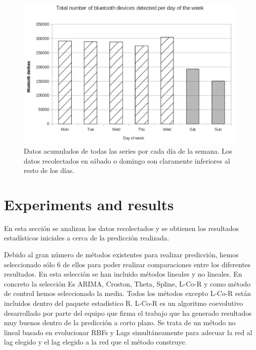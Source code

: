 \documentclass[runningheads]{llncs}
\begin{document}
\begin{figure}[htb]
 \begin{center}
\includegraphics[scale=0.6]{weekly.eps} 
 \caption{Datos acumulados de todas las series por cada día de la semana. Los datos recolectados
en sábado o domingo son claramente inferiores al resto de los días. 
 \label{fig:weekly}}
 \end{center}
 \end{figure}

\section{Experiments and results}
\label{sec:experiments}

En esta sección se analizan los datos recolectados y se obtienen los resultados estadísticos
iniciales a cerca de la predicción realizada. 

Debido al gran número de métodos existentes para realizar predicción, hemos seleccionado sólo 6 de
ellos para poder realizar comparaciones entre los diferentes resultados. En esta selección se han
incluido métodos lineales y no lineales. En concreto la selección Es ARIMA, Croston, Theta,
Spline, L-Co-R y como método de control hemos seleccionado la media. Todos los métodos excepto
L-Co-R están incluidos dentro del paquete estadístico R. L-Co-R es un algoritmo coevolutivo
desarrollado por parte del equipo que firma el trabajo que ha generado resultados muy buenos dentro
de la predicción a corto plazo. Se trata de un método no lineal basado en evolucionar RBFs y Lags
simultáneamente para adecuar la red al lag elegido y el lag elegido a la red que el método
construye.
\end{document}
